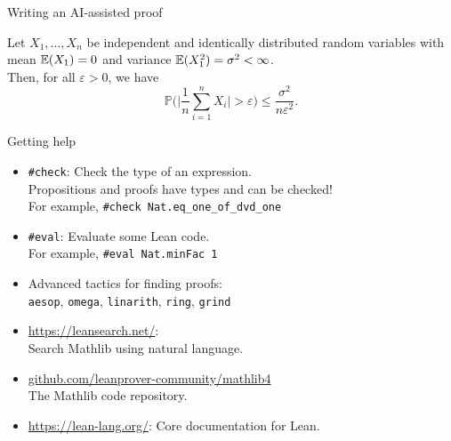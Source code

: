 \documentclass{beamer}
\begin{document}
\begin{frame}{Writing an AI-assisted proof}

  \vspace*{1mm}

  \begin{beamertheorem}
    Let $X_1, \ldots, X_n$ be independent and
    identically distributed random variables
    with mean ${\mathbb{E}}(X_1) = 0$ and variance
    ${\mathbb{E}}(X_1^2) = \sigma^2 < \infty$. \\
    Then, for all $\varepsilon > 0$, we have
    \begin{equation*}
      \mathbb{P}\Biggl(
        \biggl|
        \frac{1}{n}
        \sum_{i=1}^n
        X_i
        \biggr|
        > \varepsilon
      \Biggr)
      \leq
      \frac{\sigma^2}{n \varepsilon^2}.
    \end{equation*}
  \end{beamertheorem}

  \vspace*{1mm}


\end{frame}

\begin{frame}{Getting help}

  \vspace*{1mm}

  \begin{itemize}[<+->]
    \item \texttt{\#check}:
      Check the type of an expression. \\
      Propositions and proofs have types
      and can be checked! \\
      For example, \texttt{\#check Nat.eq\_one\_of\_dvd\_one}
    \item \texttt{\#eval}:
      Evaluate some Lean code. \\
      For example, \texttt{\#eval Nat.minFac 1}
    \item Advanced tactics for finding proofs: \\
      \texttt{aesop}, \texttt{omega}, \texttt{linarith},
      \texttt{ring}, \texttt{grind}
    \item \url{https://leansearch.net/}: \\
      Search Mathlib using natural language.
    \item \url{github.com/leanprover-community/mathlib4} \\
      The Mathlib code repository.
    \item \url{https://lean-lang.org/}:
      Core documentation for Lean.
  \end{itemize}

\end{frame}

\endNoHyper
\end{document}
